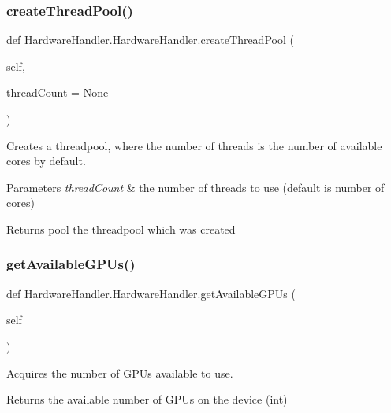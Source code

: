 \subsubsection{\texorpdfstring{create\+Thread\+Pool()}{createThreadPool()}}
{\footnotesize\ttfamily def Hardware\+Handler.\+Hardware\+Handler.\+create\+Thread\+Pool (\begin{DoxyParamCaption}\item[{}]{self,  }\item[{}]{thread\+Count = {\ttfamily None} }\end{DoxyParamCaption})}



Creates a threadpool, where the number of threads is the number of available cores by default. 


\begin{DoxyParams}{Parameters}
{\em thread\+Count} & the number of threads to use (default is number of cores) \\
\hline
\end{DoxyParams}
\begin{DoxyReturn}{Returns}
pool the threadpool which was created 
\end{DoxyReturn}
\mbox{\label{classHardwareHandler_1_1HardwareHandler_aeec8da28ba05b3d7d75cc287b12b71a6}} 
\subsubsection{\texorpdfstring{get\+Available\+G\+P\+Us()}{getAvailableGPUs()}}
{\footnotesize\ttfamily def Hardware\+Handler.\+Hardware\+Handler.\+get\+Available\+G\+P\+Us (\begin{DoxyParamCaption}\item[{}]{self }\end{DoxyParamCaption})}



Acquires the number of G\+P\+Us available to use. 

\begin{DoxyReturn}{Returns}
the available number of G\+P\+Us on the device (int) 
\end{DoxyReturn}
\mbox{\label{classHardwareHandler_1_1HardwareHandler_af9961ceb39d7c07ab58e52841a075a3c}} 
